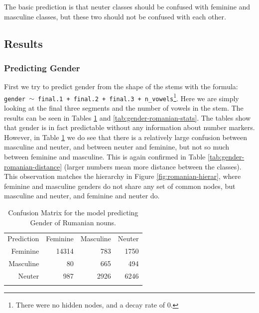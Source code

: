 The basic prediction is that neuter classes should be confused with feminine and masculine classes, but these two should not be confused with each other.

\subsection{Results}

\subsubsection{Predicting Gender}

First we try to predict gender from the shape of the stems with the formula: \texttt{gender $\sim$ final.1 + final.2 + final.3 + n\_vowels}\footnote{There were no hidden nodes, and a decay rate of 0.}. Here we are simply looking at the final three segments and the number of vowels in the stem. The results can be seen in Tables \ref{tab:gender-romanian} and \ref{tab:gender-romanian-stats}. The tables show that gender is in fact predictable without any information about number markers. However, in Table \ref{tab:gender-romanian} we do see that there is a relatively large confusion between masculine and neuter, and between neuter and feminine, but not so much between feminine and masculine. This is again confirmed in Table \ref{tab:gender-romanian-distance} (larger numbers mean more distance between the classes). This observation matches the hierarchy in Figure \ref{fig:romanian-hierar}, where feminine and masculine genders do not share any set of common nodes, but masculine and neuter, and feminine and neuter do.

\begin{table}[!htpb]
  \centering
  \begin{tabular}{rrrr}
    \lsptoprule
    \multicolumn{4}{c}{Reference}              \\
    \midrule
    Prediction & Feminine & Masculine & Neuter \\
    Feminine   & 14314    & 783       & 1750   \\
    Masculine  & 80       & 665       & 494    \\
    Neuter     & 987      & 2926      & 6246   \\
    \lspbottomrule
  \end{tabular}
  \caption{Confusion Matrix for the model predicting Gender of Rumanian nouns.}\label{tab:gender-romanian}
\end{table}

